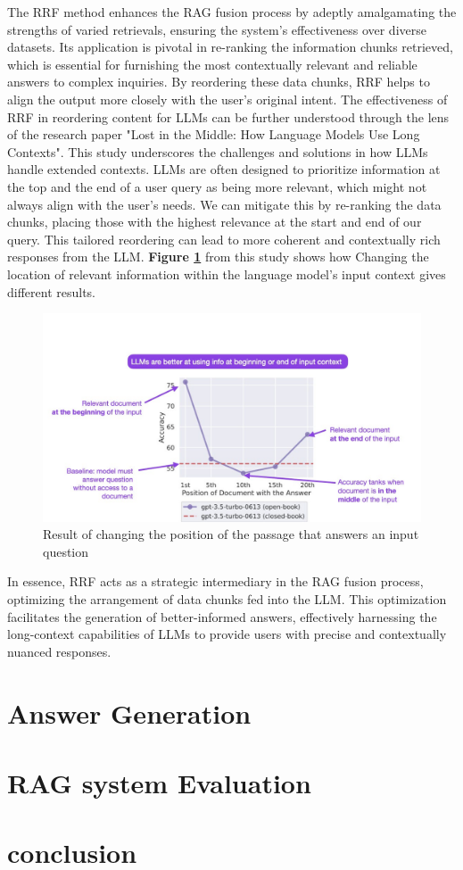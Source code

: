\vskip 0.5cm
The RRF method enhances the RAG fusion process by adeptly amalgamating the strengths of varied retrievals, ensuring the system’s effectiveness over diverse datasets. Its application is pivotal in re-ranking the information chunks retrieved, which is essential for furnishing the most contextually relevant and reliable answers to complex inquiries. By reordering these data chunks, RRF helps to align the output more closely with the user's original intent.
\vskip 0.5cm
The effectiveness of RRF in reordering content for LLMs can be further understood through the lens of the research paper "Lost in the Middle: How Language Models Use Long Contexts"\cite{w18}. This study underscores the challenges and solutions in how LLMs handle extended contexts. LLMs are often designed to prioritize information at the top and the end of a user query as being more relevant, which might not always align with the user's needs. We can mitigate this by re-ranking the data chunks, placing those with the highest relevance at the start and end of our query. This tailored reordering can lead to more coherent and contextually rich responses from the LLM. \textbf{Figure \ref{fig:lost_in}} from this study shows how Changing the location of relevant information within the language model’s input context gives different results.
\begin{figure}[H]
    \centering
    \includegraphics[width=1 \linewidth]{assets/lost_in.jpg}
    \caption{Result of changing the position of the passage that answers an input question}
    \label{fig:lost_in}
\end{figure}
\vskip 0.5cm
In essence, RRF acts as a strategic intermediary in the RAG fusion process, optimizing the arrangement of data chunks fed into the LLM. This optimization facilitates the generation of better-informed answers, effectively harnessing the long-context capabilities of LLMs to provide users with precise and contextually nuanced responses.
\section{Answer Generation}
\section{RAG system Evaluation}

\section{conclusion}





